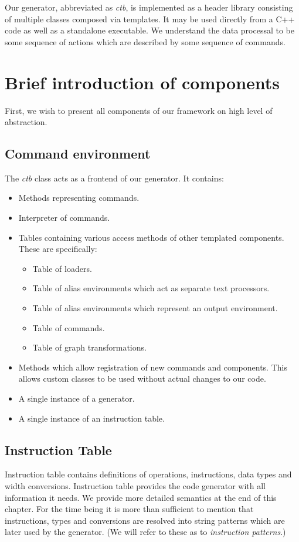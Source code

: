 Our generator, abbreviated as \emph{ctb}, is implemented as a header library consisting of multiple classes composed via templates. It may be used directly from a C++ code as well as a standalone executable. We understand the data processal to be some sequence of actions which are described by some sequence of commands. 

\section{Brief introduction of components}
First, we wish to present all components of our framework on high level of abstraction.

\subsection*{Command environment}
  The \emph{ctb} class acts as a frontend of our generator. It contains:
  \begin{itemize}
    \item Methods representing commands.
    \item Interpreter of commands.
    \item Tables containing various access methods of other templated components. These are specifically:
    \begin{itemize}
      \item Table of loaders.
      \item Table of alias environments which act as separate text processors.
      \item Table of alias environments which represent an output environment.
      \item Table of commands.
      \item Table of graph transformations.
    \end{itemize}
    \item Methods which allow registration of new commands and components. This allows custom classes to be used without actual changes to our code.
    \item A single instance of a generator.
    \item A single instance of an instruction table.
  \end{itemize}

\subsection*{Instruction Table} 
  Instruction table contains definitions of operations, instructions, data types and width conversions. Instruction table provides the code generator with all information it needs. We provide more detailed semantics at the end of this chapter. For the time being it is more than sufficient to mention that instructions, types and conversions are resolved into string patterns which are later used by the generator. (We will refer to these as to \emph{instruction patterns}.)

